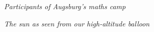 \documentclass[12pt,utf8,notheorems,compress,t]{beamer}
\renewcommand{\_}{\mathpunct{.}}
\newcommand{\?}{\,{:}\,}
\begin{document}
{
\begin{frame}[plain]
  \vspace{\textheight}\vspace{-1em}\centering
  \emph{Participants of Augsburg's maths camp}
  \par
\end{frame}}

{
\begin{frame}[plain]
  \vspace{\textheight}\vspace{-1em}\centering
  \emph{The sun as seen from our high-altitude balloon}
  \par
\end{frame}}
\end{document}
